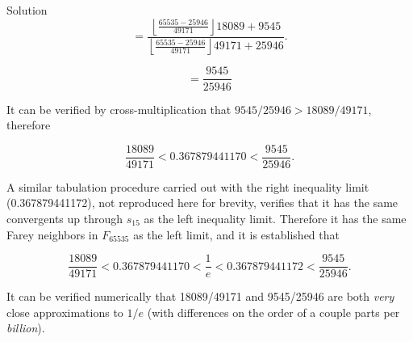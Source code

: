 \begin{vworkexampleparsection}{Solution}
\begin{equation}
\label{eq:ex:crla1:slcr0:scfr0:10:50c}
= \frac{{\displaystyle{\left\lfloor {\frac{{65535 - 25946 }}{{49171 }}} \right\rfloor}
 18089  + 9545 }}{{\displaystyle{\left\lfloor {\frac{{65535 - 25946 }}{{49171 }}}
 \right\rfloor} 49171  + 25946 }}.
\end{equation}

\begin{equation}
\label{eq:ex:crla1:slcr0:scfr0:10:50d}
= \frac{9545}{25946}
\end{equation}

It can be verified by cross-multiplication that $9545/25946 > 18089/49171$, therefore

\begin{equation}
\label{eq:ex:crla1:slcr0:scfr0:10:50e}
\frac{18089}{49171} < 0.367879441170 < \frac{9545}{25946} .
\end{equation}

A similar tabulation procedure carried out with 
the right inequality limit (0.367879441172), not reproduced here for brevity,
verifies that it has the same convergents up through $s_{15}$ as the left
inequality limit.  Therefore it has the same Farey neighbors in $F_{65535}$
as the left limit, and it is established that

\begin{equation}
\label{eq:ex:crla1:slcr0:scfr0:10:50f}
\frac{18089}{49171} < 0.367879441170 < \frac{1}{e} < 0.367879441172 < \frac{9545}{25946} .
\end{equation}

It can be verified numerically that 18089/49171 and 9545/25946 are both \emph{very}
close approximations to $1/e$ (with differences on the order of a couple parts per
\emph{billion}).
\end{vworkexampleparsection}

